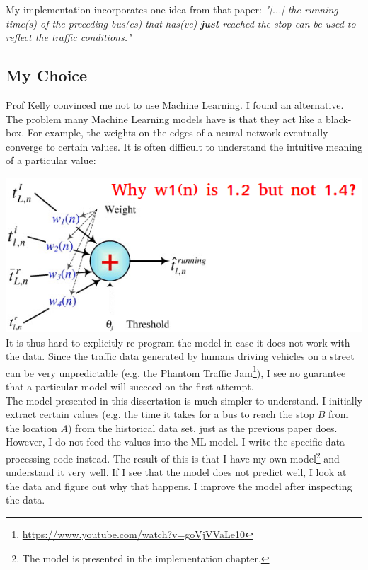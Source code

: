 \documentclass[12pt,a4paper,oneside,openright]{report}
\begin{document}
My implementation incorporates one idea from that paper:
\textit{"[...] the running time(s) of the preceding bus(es) that has(ve) \textbf{just}
reached the stop can be used to reflect the traffic conditions."} \\


\subsection{My Choice}

Prof Kelly convinced me not to use Machine Learning. I found an alternative.
The problem many Machine Learning models have is that they act like a black-box. For example,
the weights on the edges of a neural network eventually converge to certain values. It is often
difficult to understand the intuitive meaning of a particular value:

\includegraphics[width=\textwidth]{figs/ann.png} \\

It is thus hard to explicitly re-program the model in case it does not work with the data.
Since the traffic data generated by humans driving vehicles on a street can be very
unpredictable (e.g. the Phantom Traffic
Jam\footnote{\textcolor{blue}{\url{https://www.youtube.com/watch?v=goVjVVaLe10}}}),
I see no guarantee that a particular model will succeed on the first attempt. \\

The model presented in this dissertation is much simpler to understand. I initially extract
certain values (e.g. the time it takes for a bus to reach the stop $B$ from the location $A$)
from the historical data set, just as the previous paper does. However, I do not feed the values
into the ML model. I write the specific data-processing code instead. The result of this is that
I have my own model\footnote{The model is presented in the
implementation chapter.} and understand it very well. If I see that the model does not predict
well, I look at the data and figure out why that happens. I improve the model after inspecting
the data. \\
\end{document}
